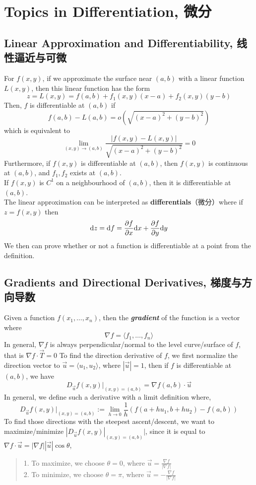 \section{Topics in Differentiation, 微分}
\subsection{Linear Approximation and Differentiability, 线性逼近与可微}
For $f(x, y)$, if we approximate the surface near $(a, b)$ with a linear function $L(x, y)$, then this linear function has the form
$$z = L(x, y) = f(a, b) + f_1(x, y)(x-a) + f_2(x, y)(y-b)$$
Then, $f$ is differentiable at $(a, b)$ if
$$f(a, b) - L(a, b) = o(\sqrt{(x-a)^2 + (y-b)^2})$$
which is equivalent to
$$\lim_{(x, y) \to (a, b)}\frac{|f(x, y) - L(x, y)|}{\sqrt{(x-a)^2 + (y-b)^2}} = 0$$
Furthermore, if $f(x, y)$ is differentiable at $(a, b)$, then $f(x, y)$ is continuous at $(a, b)$, and $f_1, f_2$ exists at $(a, b)$. \\
If $f(x, y)$ is $C^1$ on a neighbourhood of $(a, b)$, then it is differentiable at $(a, b)$. \\
The linear approximation can be interpreted as \textbf{differentials}（微分）where if $z = f(x, y)$ then
$$\dd z = \dd f = \pdv{f}{x} \dd x + \pdv{f}{y} \dd y$$
We then can prove whether or not a function is differentiable at a point from the definition.

\subsection{Gradients and Directional Derivatives, 梯度与方向导数}
Given a function $f(x_1, \dots, x_n)$, then the \textbf{\textit{gradient}} of the function is a vector where
$$\nabla f = \langle f_1, \dots, f_n \rangle$$
In general, $\nabla f$ is always perpendicular/normal to the level curve/surface of $f$, that is $\nabla f \cdot \Vec{T} = 0$
To find the direction derivative of $f$, we first normalize the direction vector to $\Vec{u} = \langle u_1, u_2 \rangle$, where $|\Vec{u}| = 1$, then if $f$ is differentiable at $(a, b)$, we have
$$D_{\Vec{u}}f(x, y)|_{(x, y) = (a, b)} = \nabla f(a, b) \cdot \Vec{u}$$
In general, we define such a derivative with a limit definition where,
$$D_{\Vec{u}}f(x, y)|_{(x, y) = (a, b)} := \lim_{h \to 0} \frac{1}{h} (f(a+hu_1, b+hu_2) - f(a, b))$$
To find those directions with the steepest ascent/descent, we want to maximize/minimize $|D_{\Vec{u}}f(x, y)|_{(x, y) = (a, b)}|$, since it is equal to $\nabla f \cdot \Vec{u} = |\nabla f||\Vec{u}|\cos{\theta}$, 
\begin{quote}
    1. To maximize, we choose $\theta = 0$, where $\Vec{u} = \frac{\nabla f}{|\nabla f|}$ \\
    2. To minimize, we choose $\theta = \pi$, where $\Vec{u} = -\frac{\nabla f}{|\nabla f|}$
\end{quote}

